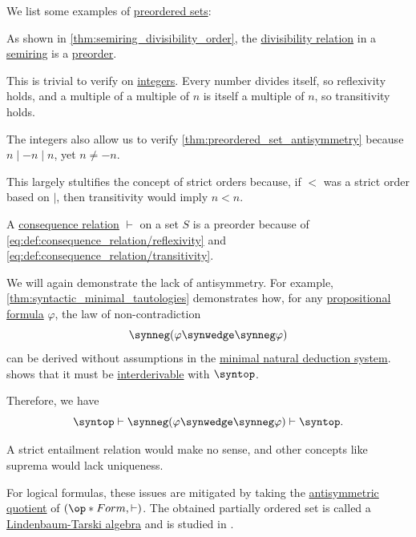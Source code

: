 \begin{example}\label{ex:def:preordered_set}
  We list some examples of \hyperref[def:preordered_set]{preordered sets}:
  \begin{thmenum}
     As shown in \cref{thm:semiring_divisibility_order}, the \hyperref[def:semiring_divisibility]{divisibility relation} in a \hyperref[def:semiring]{semiring} is a \hyperref[def:preordered_set]{preorder}.

    This is trivial to verify on \hyperref[def:integers]{integers}. Every number divides itself, so reflexivity holds, and a multiple of a multiple of \( n \) is itself a multiple of \( n \), so transitivity holds.

    The integers also allow us to verify \cref{thm:preordered_set_antisymmetry} because \( n \mid -n \mid n \), yet \( n \neq -n \).

    This largely stultifies the concept of strict orders because, if \( {<} \) was a strict order based on \( {\mid} \), then transitivity would imply \( n < n \).

     A \hyperref[def:consequence_relation]{consequence relation} \( {\vdash} \) on a set \( S \) is a preorder because of \eqref{eq:def:consequence_relation/reflexivity} and \eqref{eq:def:consequence_relation/transitivity}.

    We will again demonstrate the lack of antisymmetry. For example, \cref{thm:syntactic_minimal_tautologies} demonstrates how, for any \hyperref[def:propositional_formula]{propositional formula} \( \varphi \), the law of non-contradiction
    \begin{equation*}
      \synneg (\varphi \synwedge \synneg \varphi)
    \end{equation*}
    can be derived without assumptions in the \hyperref[def:propositional_natural_deduction]{minimal natural deduction system}.  shows that it must be \hyperref[def:interderivability]{interderivable} with \( \syntop \).

    Therefore, we have
    \begin{equation*}
      \syntop \vdash \synneg (\varphi \synwedge \synneg \varphi) \vdash \syntop.
    \end{equation*}

    A strict entailment relation would make no sense, and other concepts like suprema would lack uniqueness.

    For logical formulas, these issues are mitigated by taking the \hyperref[def:antisymmetric_quotient]{antisymmetric quotient} of \( (\op*{Form}, \vdash) \). The obtained partially ordered set is called a \hyperref[def:lindenbaum_tarski_algebra]{Lindenbaum-Tarski algebra} and is studied in .
  \end{thmenum}
\end{example}

